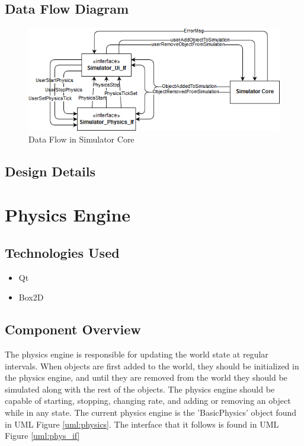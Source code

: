\subsection{Data Flow Diagram}

 \begin{figure}
 	\begin{center}
 	\includegraphics[scale=0.5]{./images_design/uml/DataFlow_simcore}
 	\caption{Data Flow in Simulator Core\label{uml:dataflow_simcore}}
 	\end{center}
 \end{figure} 

\subsection{Design Details}

\section{Physics Engine}

\subsection{Technologies  Used}
\begin{itemize}
	\item Qt
	\item Box2D
\end{itemize}

\subsection{Component  Overview}
The physics engine is responsible for updating the world state at regular intervals. When objects are first added to the world, they should be initialized in the physics engine, and until they are removed from the world they should be simulated along with the rest of the objects. The physics engine should be capable of starting, stopping, changing rate, and adding or removing an object while in any state. The current physics engine is the 'BasicPhysics' object found in UML Figure \ref{uml:physics}. The interface that it follows is found in UML Figure \ref{uml:phys_if}

